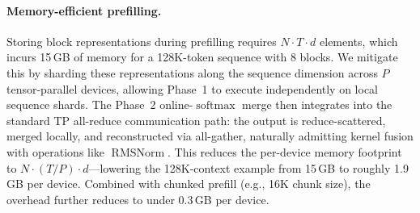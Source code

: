 \paragraph{Memory-efficient prefilling.}
Storing block representations during prefilling requires $N \cdot T \cdot d$ elements, which incurs 15\,GB of memory for a 128K-token sequence with 8 blocks. We mitigate this by sharding these representations along the sequence dimension across $P$ tensor-parallel devices, allowing Phase~1 to execute independently on local sequence shards. The Phase~2 online-$\operatorname{softmax}$ merge then integrates into the standard TP all-reduce communication path: the output is reduce-scattered, merged locally, and reconstructed via all-gather, naturally admitting kernel fusion with operations like $\operatorname{RMSNorm}$. This reduces the per-device memory footprint to $N \cdot (T/P) \cdot d$---lowering the 128K-context example from 15\,GB to roughly 1.9\,GB per device. Combined with chunked prefill (e.g., 16K chunk size), the overhead further reduces to under 0.3\,GB per device.


